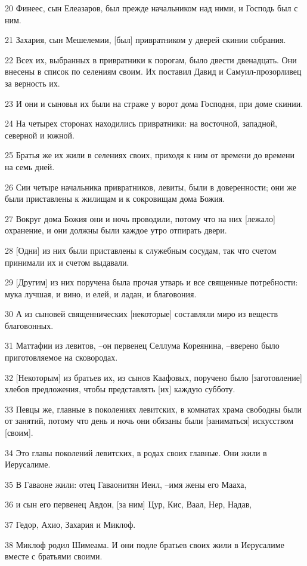 \par 20 Финеес, сын Елеазаров, был прежде начальником над ними, и Господь был с ним.
\par 21 Захария, сын Мешелемии, [был] привратником у дверей скинии собрания.
\par 22 Всех их, выбранных в привратники к порогам, было двести двенадцать. Они внесены в список по селениям своим. Их поставил Давид и Самуил-прозорливец за верность их.
\par 23 И они и сыновья их были на страже у ворот дома Господня, при доме скинии.
\par 24 На четырех сторонах находились привратники: на восточной, западной, северной и южной.
\par 25 Братья же их жили в селениях своих, приходя к ним от времени до времени на семь дней.
\par 26 Сии четыре начальника привратников, левиты, были в доверенности; они же были приставлены к жилищам и к сокровищам дома Божия.
\par 27 Вокруг дома Божия они и ночь проводили, потому что на них [лежало] охранение, и они должны были каждое утро отпирать двери.
\par 28 [Одни] из них были приставлены к служебным сосудам, так что счетом принимали их и счетом выдавали.
\par 29 [Другим] из них поручена была прочая утварь и все священные потребности: мука лучшая, и вино, и елей, и ладан, и благовония.
\par 30 А из сыновей священнических [некоторые] составляли миро из веществ благовонных.
\par 31 Маттафии из левитов, --он первенец Селлума Кореянина, --вверено было приготовляемое на сковородах.
\par 32 [Некоторым] из братьев их, из сынов Каафовых, поручено было [заготовление] хлебов предложения, чтобы представлять [их] каждую субботу.
\par 33 Певцы же, главные в поколениях левитских, в комнатах храма свободны были от занятий, потому что день и ночь они обязаны были [заниматься] искусством [своим].
\par 34 Это главы поколений левитских, в родах своих главные. Они жили в Иерусалиме.
\par 35 В Гаваоне жили: отец Гаваонитян Иеил, --имя жены его Мааха,
\par 36 и сын его первенец Авдон, [за ним] Цур, Кис, Ваал, Нер, Надав,
\par 37 Гедор, Ахио, Захария и Миклоф.
\par 38 Миклоф родил Шимеама. И они подле братьев своих жили в Иерусалиме вместе с братьями своими.

